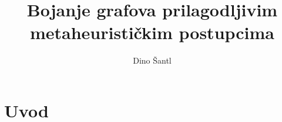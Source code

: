 \documentclass[times, utf8, diplomski, numeric]{fer}
\begin{document}

\title{Bojanje grafova prilagodljivim metaheurističkim postupcima}

\author{Dino Šantl}

\maketitle

\izvornik

\zahvala{}

\tableofcontents

\chapter{Uvod}
\end{document}

